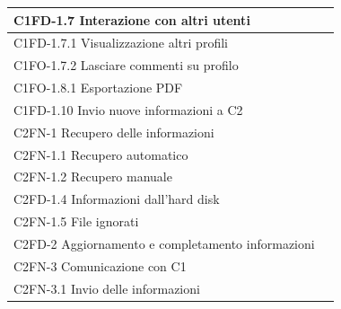 \begin{footnotesize}
\begin{longtable}[!h]{|l|l|}
C1FD-1.7 Interazione con altri utenti & \\ \hline 
C1FD-1.7.1 Visualizzazione altri profili & \\ \hline
C1FO-1.7.2 Lasciare commenti su profilo & \\ \hline
C1FO-1.8.1 Esportazione PDF & \\ \hline
C1FD-1.10 Invio nuove informazioni a C2 & \\ \hline
C2FN-1 Recupero delle informazioni & \\ \hline
C2FN-1.1 Recupero automatico & \\ \hline
C2FN-1.2 Recupero manuale & \\ \hline
C2FD-1.4 Informazioni dall'hard disk & \\ \hline
C2FN-1.5 File ignorati & \\ \hline
C2FD-2 Aggiornamento e completamento informazioni & \\ \hline 
C2FN-3 Comunicazione con C1 & \\ \hline 
C2FN-3.1 Invio delle informazioni & \\ \hline



\end{longtable}
\end{footnotesize}
